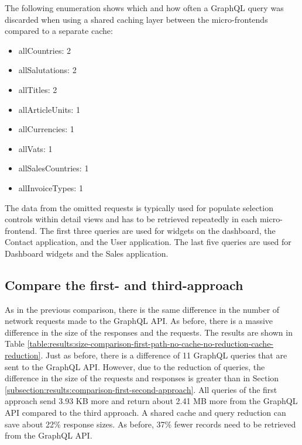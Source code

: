 \noindent The following enumeration shows which and how often a GraphQL query was discarded when using a shared caching layer between the micro-frontends compared to a separate cache:

\begin{itemize}
  \item allCountries: 2
  \item allSalutations: 2
  \item allTitles: 2
  \item allArticleUnits: 1
  \item allCurrencies: 1
  \item allVats: 1
  \item allSalesCountries: 1
  \item allInvoiceTypes: 1
\end{itemize}

\noindent The data from the omitted requests is typically used for populate selection controls within detail views and has to be retrieved repeatedly in each micro-frontend. The first three queries are used for widgets on the dashboard, the Contact application, and the User application. The last five queries are used for Dashboard widgets and the Sales application.

\subsection{Compare the first- and third-approach}\label{subsection:results:comparison-first-third-approach}

As in the previous comparison, there is the same difference in the number of network requests made to the GraphQL \ac{API}. As before, there is a massive difference in the size of the responses and the requests. The results are shown in Table \ref{table:results:size-comparison-first-path-no-cache-no-reduction-cache-reduction}. Just as before, there is a difference of 11 GraphQL queries that are sent to the GraphQL \ac{API}. However, due to the reduction of queries, the difference in the size of the requests and responses is greater than in Section \ref{subsection:results:comparison-first-second-approach}. All queries of the first approach send 3.93 KB more and return about 2.41 MB more from the GraphQL \ac{API} compared to the third approach. A shared cache and query reduction can save about 22\% response sizes. As before, 37\% fewer records need to be retrieved from the GraphQL \ac{API}.

